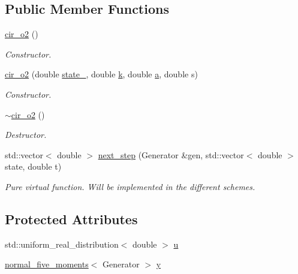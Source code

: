 \subsection*{Public Member Functions}
\begin{DoxyCompactItemize}
\item 
\mbox{\label{classcir__o2_a0f645b7ab87c6318ecb8f4654cef6ed7}} 
\mbox{\hyperlink{classcir__o2_a0f645b7ab87c6318ecb8f4654cef6ed7}{cir\+\_\+o2}} ()
\begin{DoxyCompactList}\small\item\em Constructor. \end{DoxyCompactList}\item 
\mbox{\label{classcir__o2_ae29a2538f64d667ae2b5bbb4fa6a1964}} 
\mbox{\hyperlink{classcir__o2_ae29a2538f64d667ae2b5bbb4fa6a1964}{cir\+\_\+o2}} (double \mbox{\hyperlink{classprocess_ab4d01c8ea2e9c8285134786d32ae42aa}{state\+\_}}, double \mbox{\hyperlink{classcir_aa5b05ff03ee8bb587ea94426a9ce704b}{k}}, double \mbox{\hyperlink{classcir_a358578305ea60d31c00546233304651c}{a}}, double s)
\begin{DoxyCompactList}\small\item\em Constructor. \end{DoxyCompactList}\item 
\mbox{\label{classcir__o2_ac620cae85dd92526b320b885d33e1542}} 
\mbox{\hyperlink{classcir__o2_ac620cae85dd92526b320b885d33e1542}{$\sim$cir\+\_\+o2}} ()
\begin{DoxyCompactList}\small\item\em Destructor. \end{DoxyCompactList}\item 
\mbox{\label{classcir__o2_aff77d63ff38cedf7f720f4bf081b3812}} 
std\+::vector$<$ double $>$ \mbox{\hyperlink{classcir__o2_aff77d63ff38cedf7f720f4bf081b3812}{next\+\_\+step}} (Generator \&gen, std\+::vector$<$ double $>$ state, double t)
\begin{DoxyCompactList}\small\item\em Pure virtual function. Will be implemented in the different schemes. \end{DoxyCompactList}\end{DoxyCompactItemize}
\subsection*{Protected Attributes}
\begin{DoxyCompactItemize}
\item 
std\+::uniform\+\_\+real\+\_\+distribution$<$ double $>$ \mbox{\hyperlink{classcir__o2_a37d01ddf0963358ef44dcb20938b54fa}{u}}
\item 
\mbox{\hyperlink{classnormal__five__moments}{normal\+\_\+five\+\_\+moments}}$<$ Generator $>$ \mbox{\hyperlink{classcir__o2_a13719fb45e809812b9f62916d6baba2c}{y}}
\end{DoxyCompactItemize}


